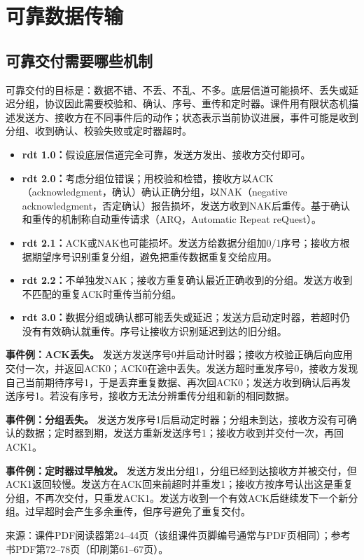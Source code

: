 \section{可靠数据传输}
\subsection{可靠交付需要哪些机制}
可靠交付的目标是：数据不错、不丢、不乱、不多。底层信道可能损坏、丢失或延迟分组，协议因此需要校验和、确认、序号、重传和定时器。课件用有限状态机描述发送方、接收方在不同事件后的动作；状态表示当前协议进展，事件可能是收到分组、收到确认、校验失败或定时器超时。

\begin{itemize}[nosep]
\item \textbf{rdt 1.0：}假设底层信道完全可靠，发送方发出、接收方交付即可。
\item \textbf{rdt 2.0：}考虑分组位错误；用校验和检错，接收方以ACK（acknowledgment，确认）确认正确分组，以NAK（negative acknowledgment，否定确认）报告损坏，发送方收到NAK后重传。基于确认和重传的机制称自动重传请求（ARQ，Automatic Repeat reQuest）。
\item \textbf{rdt 2.1：}ACK或NAK也可能损坏。发送方给数据分组加0/1序号；接收方根据期望序号识别重复分组，避免把重传数据重复交给应用。
\item \textbf{rdt 2.2：}不单独发NAK；接收方重复确认最近正确收到的分组。发送方收到不匹配的重复ACK时重传当前分组。
\item \textbf{rdt 3.0：}数据分组或确认都可能丢失或延迟；发送方启动定时器，若超时仍没有有效确认就重传。序号让接收方识别延迟到达的旧分组。
\end{itemize}

\textbf{事件例：ACK丢失。} 发送方发送序号0并启动计时器；接收方校验正确后向应用交付一次，并返回ACK0；ACK0在途中丢失。发送方超时重发序号0，接收方发现自己当前期待序号1，于是丢弃重复数据、再次回ACK0；发送方收到确认后再发送序号1。若没有序号，接收方无法分辨重传分组和新的相同数据。

\textbf{事件例：分组丢失。} 发送方发序号1后启动定时器；分组未到达，接收方没有可确认的数据；定时器到期，发送方重新发送序号1；接收方收到并交付一次，再回ACK1。

\textbf{事件例：定时器过早触发。} 发送方发出分组1，分组已经到达接收方并被交付，但ACK1返回较慢。发送方在ACK回来前超时并重发1；接收方按序号认出这是重复分组，不再次交付，只重发ACK1。发送方收到一个有效ACK后继续发下一个新分组。过早超时会产生多余重传，但序号避免了重复交付。

\annotationarea[4]
\small 来源：课件PDF阅读器第24--44页（该组课件页脚编号通常与PDF页相同）；参考书PDF第72--78页（印刷第61--67页）。\normalsize


